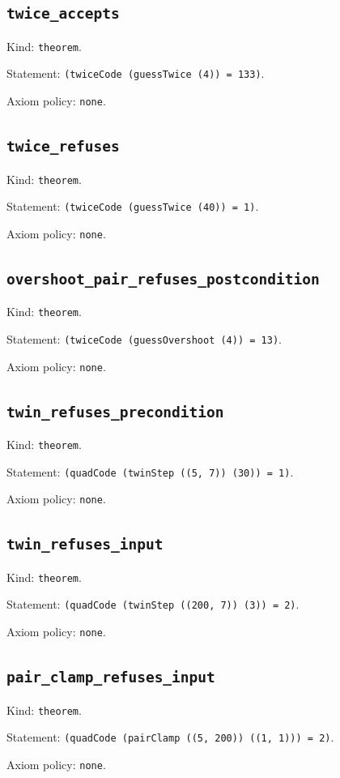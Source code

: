 \documentclass[11pt]{article}
\begin{document}
\subsection*{\texttt{twice\_accepts}}
\noindent Kind: \texttt{theorem}.\par
\noindent Statement: \texttt{(twiceCode (guessTwice (4)) = 133)}.\par
\noindent Axiom policy: \texttt{none}.\par
\subsection*{\texttt{twice\_refuses}}
\noindent Kind: \texttt{theorem}.\par
\noindent Statement: \texttt{(twiceCode (guessTwice (40)) = 1)}.\par
\noindent Axiom policy: \texttt{none}.\par
\subsection*{\texttt{overshoot\_pair\_refuses\_postcondition}}
\noindent Kind: \texttt{theorem}.\par
\noindent Statement: \texttt{(twiceCode (guessOvershoot (4)) = 13)}.\par
\noindent Axiom policy: \texttt{none}.\par
\subsection*{\texttt{twin\_refuses\_precondition}}
\noindent Kind: \texttt{theorem}.\par
\noindent Statement: \texttt{(quadCode (twinStep ((5, 7)) (30)) = 1)}.\par
\noindent Axiom policy: \texttt{none}.\par
\subsection*{\texttt{twin\_refuses\_input}}
\noindent Kind: \texttt{theorem}.\par
\noindent Statement: \texttt{(quadCode (twinStep ((200, 7)) (3)) = 2)}.\par
\noindent Axiom policy: \texttt{none}.\par
\subsection*{\texttt{pair\_clamp\_refuses\_input}}
\noindent Kind: \texttt{theorem}.\par
\noindent Statement: \texttt{(quadCode (pairClamp ((5, 200)) ((1, 1))) = 2)}.\par
\noindent Axiom policy: \texttt{none}.\par
\end{document}
